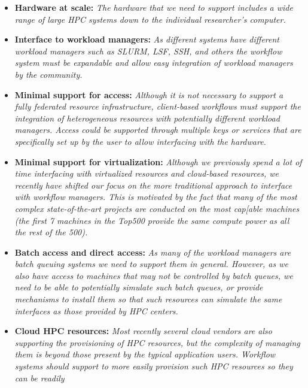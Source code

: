 \documentclass[utf8]{FrontiersinVancouver} %
\begin{document}
\begin{BOX}

\begin{itemize}
\item {\bf Hardware at scale:} {\it The hardware that we need to
    support includes a wide range of large HPC systems down to the individual researcher's computer.}
\item {\bf Interface to workload managers:} {\it As different systems
    have different workload managers such as SLURM, LSF, SSH, and
    others the workflow system must be expandable and allow easy
    integration of workload managers by the community.}  
\item {\bf Minimal support for access:} {\it Although it is not
    necessary to support a fully federated resource infrastructure,
    client-based workflows must support the integration of
    heterogeneous resources with potentially different workload
    managers. Access could be supported through multiple keys or
    services that are specifically set up by the user to allow
    interfacing with the hardware.}
\item {\bf Minimal support for virtualization:} {\it Although we
    previously spend a lot of time interfacing with virtualized
    resources and cloud-based resources, we recently have shifted our
    focus on the more traditional approach to interface with workflow
    managers. This is motivated by the fact that many of the
    most complex state-of-the-art projects are conducted on the most
    cap[able machines (the first 7 machines in the Top500 provide the
    same compute power as all the rest of the 500).}
\item {\bf Batch access and direct access:} {\it As many of the
    workload managers are batch queuing systems we need to support
    them in general. However, as we also have access to machines that
    may not be controlled by batch queues, we need to be able to
    potentially simulate such batch queues, or provide mechanisms to
    install them so that such resources can simulate the same
    interfaces as those provided by HPC centers.}
 \item {\bf Cloud HPC resources:} {\it Most recently several cloud
     vendors are also supporting the provisioning of HPC resources,
     but the complexity of managing them is beyond those present by the
     typical application users. Workflow systems should support to
     more easily provision such HPC resources so they can be readily
}
\end{itemize}
\end{BOX}
\end{document}
